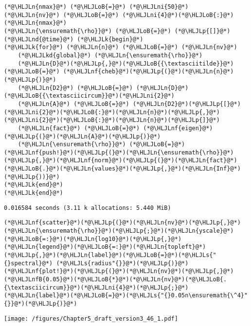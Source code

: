 \documentclass[12pt,landscape]{article}
\newcommand{\HLJLk}[1]{\textcolor[RGB]{148,91,176}{\textbf{#1}}}
\newcommand{\HLJLkd}[1]{\textcolor[RGB]{214,102,97}{\textit{#1}}}
\newcommand{\HLJLn}[1]{#1}
\newcommand{\HLJLnd}[1]{\textcolor[RGB]{214,102,97}{#1}}
\newcommand{\HLJLnf}[1]{\textcolor[RGB]{66,102,213}{#1}}
\newcommand{\HLJLs}[1]{\textcolor[RGB]{201,61,57}{#1}}
\newcommand{\HLJLnfB}[1]{\textcolor[RGB]{59,151,46}{#1}}
\newcommand{\HLJLni}[1]{\textcolor[RGB]{59,151,46}{#1}}
\newcommand{\HLJLoB}[1]{\textcolor[RGB]{102,102,102}{\textbf{#1}}}
\newcommand{\HLJLp}[1]{#1}
\begin{document}
{\begin{lstlisting}
(*@\HLJLn{nmax}@*) (*@\HLJLoB{=}@*) (*@\HLJLni{50}@*)
(*@\HLJLn{nv}@*) (*@\HLJLoB{=}@*) (*@\HLJLni{4}@*)(*@\HLJLoB{:}@*)(*@\HLJLn{nmax}@*)
(*@\HLJLn{\ensuremath{\rho}}@*) (*@\HLJLoB{=}@*) (*@\HLJLp{[]}@*)
(*@\HLJLnd{@time}@*) (*@\HLJLk{begin}@*)
(*@\HLJLk{for}@*) (*@\HLJLn{n}@*) (*@\HLJLoB{=}@*) (*@\HLJLn{nv}@*)
    (*@\HLJLkd{global}@*) (*@\HLJLn{\ensuremath{\rho}}@*)
    (*@\HLJLn{D}@*)(*@\HLJLp{,}@*)(*@\HLJLoB{{\textasciitilde}}@*) (*@\HLJLoB{=}@*) (*@\HLJLnf{cheb}@*)(*@\HLJLp{(}@*)(*@\HLJLn{n}@*)(*@\HLJLp{)}@*)
    (*@\HLJLn{D2}@*) (*@\HLJLoB{=}@*) (*@\HLJLn{D}@*)(*@\HLJLoB{{\textasciicircum}}@*)(*@\HLJLni{2}@*)
    (*@\HLJLn{A}@*) (*@\HLJLoB{=}@*) (*@\HLJLn{D2}@*)(*@\HLJLp{[}@*)(*@\HLJLni{2}@*)(*@\HLJLoB{:}@*)(*@\HLJLn{n}@*)(*@\HLJLp{,}@*)(*@\HLJLni{2}@*)(*@\HLJLoB{:}@*)(*@\HLJLn{n}@*)(*@\HLJLp{]}@*)
    (*@\HLJLn{fact}@*) (*@\HLJLoB{=}@*) (*@\HLJLnf{eigen}@*)(*@\HLJLp{(}@*)(*@\HLJLn{A}@*)(*@\HLJLp{)}@*)
    (*@\HLJLn{\ensuremath{\rho}}@*) (*@\HLJLoB{=}@*) (*@\HLJLnf{push!}@*)(*@\HLJLp{(}@*)(*@\HLJLn{\ensuremath{\rho}}@*)(*@\HLJLp{,}@*)(*@\HLJLnf{norm}@*)(*@\HLJLp{(}@*)(*@\HLJLn{fact}@*)(*@\HLJLoB{.}@*)(*@\HLJLn{values}@*)(*@\HLJLp{,}@*)(*@\HLJLn{Inf}@*)(*@\HLJLp{))}@*)
(*@\HLJLk{end}@*)
(*@\HLJLk{end}@*)
\end{lstlisting}

\begin{lstlisting}
0.016584 seconds (3.11 k allocations: 5.440 MiB)
\end{lstlisting}


\begin{lstlisting}
(*@\HLJLnf{scatter}@*)(*@\HLJLp{(}@*)(*@\HLJLn{nv}@*)(*@\HLJLp{,}@*)(*@\HLJLn{\ensuremath{\rho}}@*)(*@\HLJLp{;}@*)(*@\HLJLn{yscale}@*)(*@\HLJLoB{=:}@*)(*@\HLJLn{log10}@*)(*@\HLJLp{,}@*)(*@\HLJLn{legend}@*)(*@\HLJLoB{=:}@*)(*@\HLJLn{topleft}@*)(*@\HLJLp{,}@*)(*@\HLJLn{label}@*)(*@\HLJLoB{=}@*)(*@\HLJLs{"{}spectral}@*) (*@\HLJLs{radius"{}}@*)(*@\HLJLp{)}@*)
(*@\HLJLnf{plot!}@*)(*@\HLJLp{(}@*)(*@\HLJLn{nv}@*)(*@\HLJLp{,}@*)(*@\HLJLnfB{0.05}@*)(*@\HLJLoB{*}@*)(*@\HLJLn{nv}@*)(*@\HLJLoB{.{\textasciicircum}}@*)(*@\HLJLni{4}@*)(*@\HLJLp{;}@*)(*@\HLJLn{label}@*)(*@\HLJLoB{=}@*)(*@\HLJLs{"{}0.05n\ensuremath{\^4}"{}}@*)(*@\HLJLp{)}@*)
\end{lstlisting}

\texttt{[image: /figures/Chapter5\_draft\_version3\_46\_1.pdf]}

}
\end{document}
